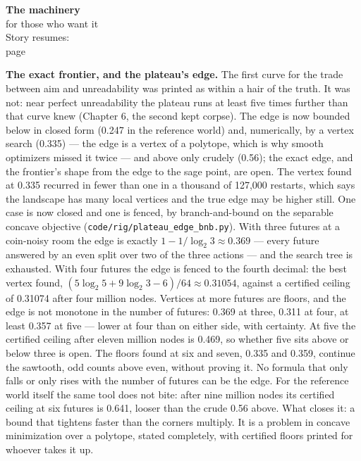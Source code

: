 \begin{machinery}{\textbf{The machinery}\\for those who want it\\[3pt]{\color{muted}Story resumes:\\page~\pageref{ch15-s5}}}


\textbf{The exact frontier, and the plateau's edge.} The first curve for
the trade between aim and unreadability was printed as within a hair
of the truth. It was not: near perfect unreadability the plateau runs
at least five times further than that curve knew (Chapter 6, the
second kept corpse). The edge is now bounded below in closed form
(0.247 in the reference world) and, numerically, by a vertex search
(0.335) --- the edge is a vertex of a polytope, which is why smooth
optimizers missed it twice --- and above only crudely (0.56); the exact
edge, and the frontier's shape from the edge to the sage point, are
open. The vertex found at 0.335 recurred in fewer than one in a
thousand of 127,000 restarts, which says the landscape has many local
vertices and the true edge may be higher still. One case is now
closed and one is fenced, by branch-and-bound on the separable concave
objective (\texttt{code/\allowbreak{}rig/\allowbreak{}plateau\_\allowbreak{}edge\_\allowbreak{}bnb.\allowbreak{}py}). With three futures at a
coin-noisy room the edge is exactly \(1 - 1/\log_2 3 \approx 0.369\) --- every
future answered by an even split over two of the three actions --- and
the search tree is exhausted. With four futures the edge is fenced to
the fourth decimal: the best vertex found, \((5\log_2 5 + 9\log_2 3 - 6)/64 \approx 0.31054\), against a certified ceiling of 0.31074 after four million
nodes. Vertices at more futures are floors, and the edge is not
monotone in the number of futures: 0.369 at three, 0.311 at four, at
least 0.357 at five --- lower at four than on either side, with
certainty. At five the certified ceiling after eleven million nodes
is 0.469, so whether five sits above or below three is open. The
floors found at six and seven, 0.335 and 0.359,
continue the sawtooth, odd counts above even, without proving it. No
formula that only falls or only rises with the number of futures can
be the edge. For the reference world itself
the same tool does not bite: after nine million nodes its certified
ceiling at six futures is 0.641, looser than the crude 0.56 above.
What closes it: a bound that tightens faster than the corners
multiply. It is a problem in concave minimization over a polytope,
stated completely, with certified floors printed for whoever takes it
up.


\end{machinery}
